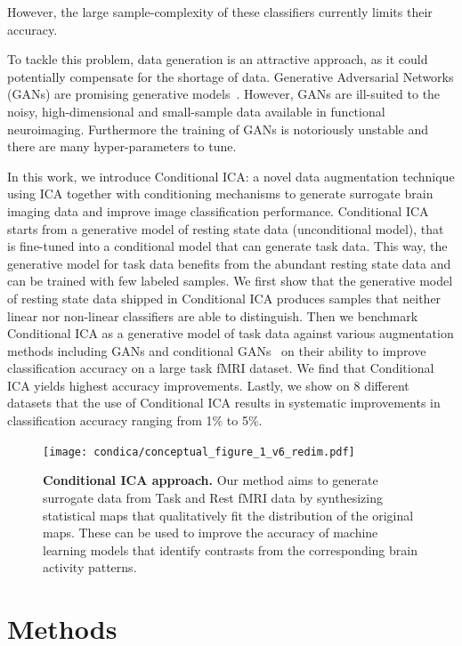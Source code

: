 %
However, the large sample-complexity of these classifiers currently limits their accuracy.
%

To tackle this problem, data generation is an attractive approach, as
it could potentially compensate for the shortage of data.
Generative Adversarial Networks (GANs) are promising generative
models~\cite{goodfellow2014generative}.
% 
However, GANs are ill-suited to the noisy, high-dimensional and
small-sample data available in functional neuroimaging. 
%
Furthermore the training of GANs is notoriously unstable and there are many hyper-parameters to tune.
%


In this work, we introduce Conditional ICA: a novel data augmentation technique using ICA together with conditioning mechanisms to generate surrogate brain imaging data and improve image classification performance.
%
Conditional ICA starts from a generative model of resting state data (unconditional model), that is fine-tuned into a conditional model that can generate task data. 
%
This way, the generative model for task data benefits from the abundant
resting state data and can be trained with few labeled samples.
%
We first show that the generative model of resting state data shipped in Conditional
ICA produces samples that neither linear nor non-linear classifiers are able to distinguish.
%
Then we benchmark Conditional ICA as a generative model of task data against
various augmentation methods including GANs and conditional GANs~\cite{mirza2014conditional} on their
ability to improve classification accuracy on a large task fMRI dataset. We find that Conditional ICA yields highest accuracy improvements.
Lastly, we show on 8 different datasets that the use of Conditional ICA results in systematic improvements in classification accuracy ranging from 1\% to 5\%.


\begin{figure}
\centerline{\texttt{[image: condica/conceptual\_figure\_1\_v6\_redim.pdf]}}
\caption{\textbf{Conditional ICA approach.} Our method aims to
  generate surrogate data from Task and Rest fMRI data by synthesizing
  statistical maps that qualitatively fit the distribution of the
  original maps. These can be used to improve the accuracy of
  machine learning models that identify contrasts from the
  corresponding brain activity patterns.}
\label{Fig0}
\end{figure}



\section{Methods}

